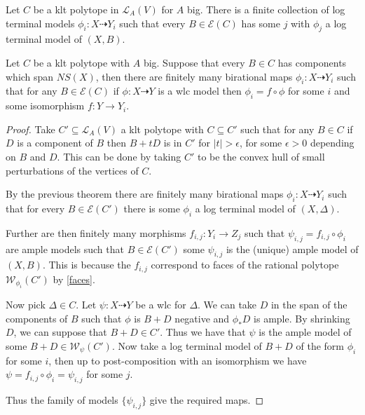 \documentclass[a4paper,12pt]{amsart}
\begin{document}
	\begin{theorem}\cite[Theorem 9.33]{bhatt2020globally+}
		Let $C$ be a klt polytope in $\mathcal{L}_{A}(V)$ for $A$ big. There is a finite collection of log terminal models $\phi_{i}: X \dashrightarrow Y_{i}$ such that  every $B \in \mathcal{E}(C)$ has some $j$ with $\phi_{j}$ a log terminal model of $(X,B)$. 
	\end{theorem}
	
	
	\begin{corollary}\label{klt_finiteness}
		Let $C$ be a klt polytope with $A$ big. Suppose that every $B \in C$ has components which span $NS(X)$, then there are finitely many birational maps $\phi_{i}: X \dashrightarrow Y_{i}$ such that for any $B \in \mathcal{E}(C)$ if $\phi: X \dashrightarrow Y$ is a wlc model then $\phi_{i}=f \circ \phi$ for some $i$ and some isomorphism $f: Y \to Y_{i}$.
	\end{corollary}
	
	\begin{proof}
		
		Take $C'\subseteq \mathcal{L}_{A}(V)$ a klt polytope with $C \subseteq C'$ such that for any $B \in C$ if $D$ is a component of $B$ then $B+tD$ is in $C'$ for $|t| > \epsilon$, for some $\epsilon >0$ depending on $B$ and $D$. This can be done by taking $C'$ to be the convex hull of small perturbations of the vertices of $C$.
		
		By the previous theorem there are finitely many birational maps $\phi_{i}: X \dashrightarrow Y_{i}$ such that for every $B \in \mathcal{E}(C')$ there is some $\phi_{i}$ a log terminal model of $(X,\Delta)$.
		
		Further are then finitely many morphisms $f_{i,j}:Y_{i}\to Z_{j}$ such that $\psi_{i,j}=f_{i,j} \circ \phi_{i}$ are ample models such that $B \in \mathcal{E}(C')$ some $\psi_{i,j}$ is the (unique) ample model of $(X,B)$. This is because the $f_{i,j}$ correspond to faces of the rational polytope $\mathcal{W}_{\phi_{i}}(C')$ by \autoref{faces}.
		
		Now pick $\Delta \in C$. Let $\psi: X \dashrightarrow Y$ be a wlc for $\Delta$. We can take $D$ in the span of the components of $B$ such that $\phi$ is $B+D$ negative and $\phi_{*}D$ is ample. By shrinking $D$, we can suppose that $B+D\in C'$. Thus we have that $\psi$ is the ample model of some $B+D \in \mathcal{W}_{\psi}(C')$. Now take a log terminal model of $B+D$ of the form $\phi_{i}$ for some $i$, then up to post-composition with an isomorphism we have $\psi=f_{i,j} \circ \phi_{i}=\psi_{i,j}$ for some $j$. 
		
		Thus the family of models $\{\psi_{i,j}\}$ give the required maps.
		
	\end{proof}
\end{document}
